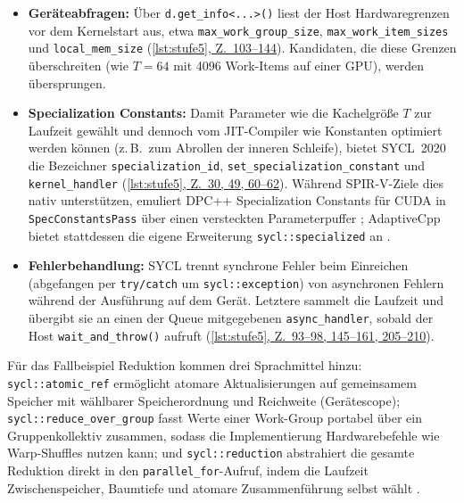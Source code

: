 \documentclass[12pt,a4paper]{article}
\newcommand{\stelle}[2]{(\hyperref[#1]{\ref*{#1}, Z.~#2})}
\begin{document}
\begin{itemize}[nosep]
    \item \textbf{Geräteabfragen:} Über \texttt{d.get\_info<...>()} liest der
    Host Hardwaregrenzen vor dem Kernelstart aus, etwa
    \texttt{max\_\allowbreak work\_\allowbreak group\_\allowbreak size},
    \texttt{max\_\allowbreak work\_\allowbreak item\_\allowbreak sizes} und
    \texttt{local\_\allowbreak mem\_\allowbreak size} \stelle{lst:stufe5}{103--144}.
    Kandidaten, die diese Grenzen überschreiten (wie $T=64$ mit 4096 Work-Items
    auf einer GPU), werden übersprungen.
    \item \textbf{Specialization Constants:} Damit Parameter wie die Kachelgröße
    $T$ zur Laufzeit gewählt und dennoch vom JIT-Compiler wie Konstanten
    optimiert werden können (z.\,B.\ zum Abrollen der inneren Schleife), bietet
    SYCL~2020 die Bezeichner \texttt{specialization\_\allowbreak id},
    \texttt{set\_\allowbreak specialization\_\allowbreak constant} und
    \texttt{kernel\_\allowbreak handler} \stelle{lst:stufe5}{30, 49, 60--62}.
    Während SPIR-V-Ziele dies nativ unterstützen, emuliert DPC++ Specialization
    Constants für CUDA in \texttt{Spec\allowbreak Constants\allowbreak Pass}
    über einen versteckten Parameterpuffer \cite{dpcpp_spec_const}; AdaptiveCpp
    bietet stattdessen die eigene Erweiterung \texttt{sycl::\allowbreak specialized}
    an \cite{adaptivecpp_ext}.
    \item \textbf{Fehlerbehandlung:} SYCL trennt synchrone Fehler beim
    Einreichen (abgefangen per \texttt{try/catch} um \texttt{sycl::\allowbreak exception})
    von asynchronen Fehlern während der Ausführung auf dem Gerät. Letztere
    sammelt die Laufzeit und übergibt sie an einen der Queue mitgegebenen
    \texttt{async\_\allowbreak handler}, sobald der Host
    \texttt{wait\_\allowbreak and\_\allowbreak throw()}
    aufruft \stelle{lst:stufe5}{93--98, 145--161, 205--210}.
\end{itemize}

\noindent Für das Fallbeispiel Reduktion kommen drei Sprachmittel hinzu:
\texttt{sycl::\allowbreak atomic\_\allowbreak ref} ermöglicht atomare
Aktualisierungen auf gemeinsamem Speicher mit wählbarer Speicherordnung und
Reichweite (Gerätescope);
\texttt{sycl::\allowbreak reduce\_\allowbreak over\_\allowbreak group} fasst
Werte einer Work-Group portabel über ein Gruppenkollektiv zusammen, sodass die
Implementierung Hardwarebefehle wie Warp-Shuffles nutzen kann; und
\texttt{sycl::\allowbreak reduction} abstrahiert die gesamte Reduktion direkt in den
\texttt{parallel\_\allowbreak for}-Aufruf, indem die Laufzeit Zwischenspeicher, Baumtiefe
und atomare Zusammenführung selbst wählt \cite{khronos2020sycl}.
\end{document}
